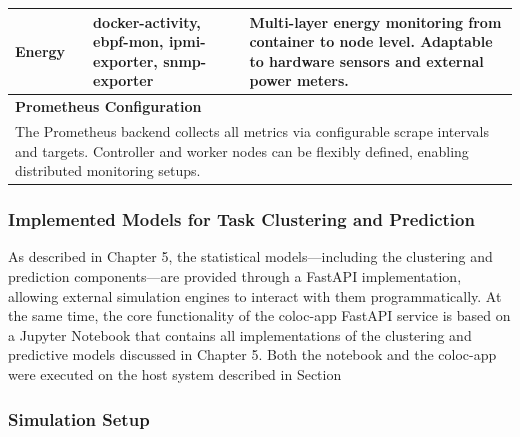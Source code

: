 \begin{table}[H]
{\begin{tabular}{
            p{3.5cm}
            >{\centering\arraybackslash}p{2cm}
            p{5cm}
            p{6cm}
            }
            Energy                     &                  & docker-activity, ebpf-mon, ipmi-exporter, snmp-exporter & Multi-layer energy monitoring from container to node level. Adaptable to hardware sensors and external power meters.    \\

            \midrule
            \multicolumn{4}{l}{\textbf{Prometheus Configuration}}                                                                                                                                                                             \\[3pt]
            \multicolumn{4}{p{16.5cm}}{
                The Prometheus backend collects all metrics via configurable scrape intervals and targets. Controller and worker nodes can be flexibly defined, enabling distributed monitoring setups.
            }                                                                                                                                                                                                                                 \\

            \bottomrule
        \end{tabular}
    }
\end{table}

\subsubsection{Implemented Models for Task Clustering and Prediction}
\label{sec:evaluation_statistical_learning_methods}
As described in Chapter 5, the statistical models—including the clustering and prediction components—are provided through a FastAPI implementation, allowing external simulation engines to interact with them programmatically. At the same time, the core functionality of the coloc-app FastAPI service is based on a Jupyter Notebook that contains all implementations of the clustering and predictive models discussed in Chapter 5. Both the notebook and the coloc-app were executed on the host system described in Section %

\subsubsection{Simulation Setup}
\label{sec:evaluation_simulation}

